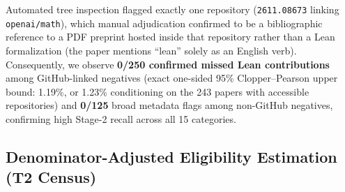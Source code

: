 \documentclass[11pt,letterpaper]{article}
\begin{document}
Automated tree inspection flagged exactly one repository (\texttt{2611.08673} linking \texttt{openai/math}), which manual adjudication confirmed to be a bibliographic reference to a PDF preprint hosted inside that repository rather than a Lean formalization (the paper mentions ``lean'' solely as an English verb). Consequently, we observe \textbf{0/250 confirmed missed Lean contributions} among GitHub-linked negatives (exact one-sided 95\% Clopper--Pearson upper bound: 1.19\%, or 1.23\% conditioning on the 243 papers with accessible repositories) and \textbf{0/125} broad metadata flags among non-GitHub negatives, confirming high Stage-2 recall across all 15 categories.

\subsection{Denominator-Adjusted Eligibility Estimation (T2 Census)}
\label{sec:eligibility_method}
\end{document}
